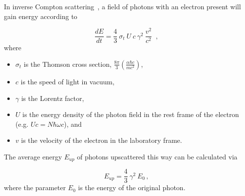   In inverse Compton scattering~\cite{inv_compt1,inv_compt2}, a field of photons with an electron present will gain energy according to 
  
  \begin{equation}\label{eqn:inv_compt_en_gain_rate}
    \frac{dE}{dt} = \frac{4}{3} \: \sigma_{t} \: U \: c \: \gamma^2 \: \frac{ v^2 }{ c^2 } \;\; ,
  \end{equation}
  where
  
  \begin{itemize}
    \item $\sigma_{t}$ is the Thomson cross section, $\frac{8\pi}{3} \left ( \frac{\alpha \hbar c}{m c^2} \right )$,
    \item $c$ is the speed of light in vacuum,
    \item $\gamma$ is the Lorentz factor,
    \item $U$ is the energy density of the photon field in the rest frame of the electron (e.g. $Uc=N\hbar \omega c$), and 
    \item $v$ is the velocity of the electron in the laboratory frame.
  \end{itemize}
  The average energy $E_{up}$ of photons upscattered this way can be calculated via
  
  \begin{equation}\label{eqn:inv_compt_avg_up_en}
    E_{up} = \frac{4}{3} \: \gamma^2 \: E_{0} \,,
  \end{equation}
  where the parameter $E_{0}$ is the energy of the original photon.
  
  
  
  
  
